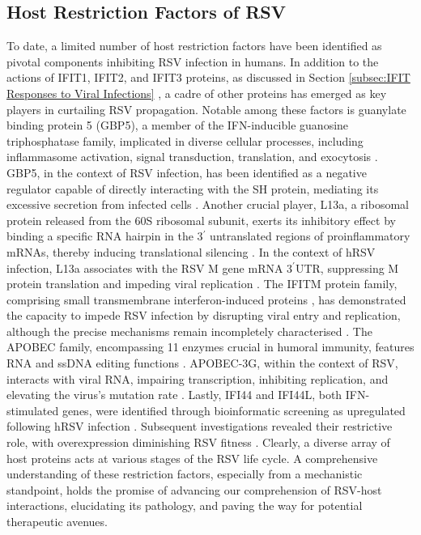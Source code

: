 \subsection{Host Restriction Factors of RSV} \label{subsec:Host Restriction Factors of RSV}
To date, a limited number of host restriction factors have been identified as pivotal components inhibiting RSV infection in humans. In addition to the actions of IFIT1, IFIT2, and IFIT3 proteins, as discussed in Section \ref{subsec:IFIT Responses to Viral Infections} \cite{Drori2020InfluenzaProteins}, a cadre of other proteins has emerged as key players in curtailing RSV propagation. Notable among these factors is guanylate binding protein 5 (GBP5), a member of the IFN-inducible guanosine triphosphatase family, implicated in diverse cellular processes, including inflammasome activation, signal transduction, translation, and exocytosis \cite{Feng2017InducibleInfection}. GBP5, in the context of RSV infection, has been identified as a negative regulator capable of directly interacting with the SH protein, mediating its excessive secretion from infected cells \cite{Li2020GBP5Virus}. Another crucial player, L13a, a ribosomal protein released from the 60S ribosomal subunit, exerts its inhibitory effect by binding a specific RNA hairpin in the 3$^{\prime}$ untranslated regions of proinflammatory mRNAs, thereby inducing translational silencing \cite{Sampath2004NoncanonicalSynthetase, Vyas2009Genome-WideMonocytes}. In the context of hRSV infection, L13a associates with the RSV M gene mRNA 3$^{\prime}$UTR, suppressing M protein translation and impeding viral replication \cite{Mazumder2014ExtraribosomalDefense}. The IFITM protein family, comprising small transmembrane interferon-induced proteins \cite{Diamond2013TheProteins}, has demonstrated the capacity to impede RSV infection by disrupting viral entry and replication, although the precise mechanisms remain incompletely characterised \cite{Smith2019Interferon-InducedMembrane}. The APOBEC family, encompassing 11 enzymes crucial in humoral immunity, features RNA and ssDNA editing functions \cite{Chelico2009StochasticAPOBEC3G}. APOBEC-3G, within the context of RSV, interacts with viral RNA, impairing transcription, inhibiting replication, and elevating the virus's mutation rate \cite{Fehrholz2012TheViruses}. Lastly, IFI44 and IFI44L, both IFN-stimulated genes, were identified through bioinformatic screening as upregulated following hRSV infection \cite{McDonald2016ADisease, Li2021IdentificationVirus}. Subsequent investigations revealed their restrictive role, with overexpression diminishing RSV fitness \cite{Busse2020Interferon-InducedVirus}. Clearly, a diverse array of host proteins acts at various stages of the RSV life cycle. A comprehensive understanding of these restriction factors, especially from a mechanistic standpoint, holds the promise of advancing our comprehension of RSV-host interactions, elucidating its pathology, and paving the way for potential therapeutic avenues.

